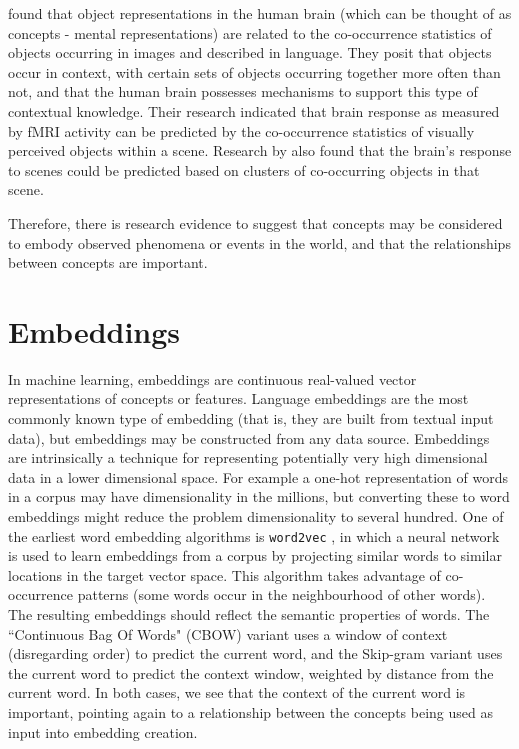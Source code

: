 \cite{CoocurrenceVisionLanguage2021} found that object representations in the human brain (which can be thought of as concepts - mental representations) are related to the co-occurrence statistics of objects occurring in images and described in language. They posit that objects occur in context, with certain sets of objects occurring together more often than not, and that the human brain possesses mechanisms to support this type of contextual knowledge. Their research indicated that brain response as measured by fMRI activity can be predicted by the co-occurrence statistics of visually perceived objects within a scene. Research by \cite{STANSBURY20131025} also found that the brain's response to scenes could be predicted based on clusters of co-occurring objects in that scene. 

Therefore, there is research evidence to suggest that concepts may be considered to embody observed phenomena or events in the world, and that the relationships between concepts are important. 


\section{Embeddings}

In machine learning, embeddings are continuous real-valued vector representations of concepts or features. Language embeddings are the most commonly known type of embedding (that is, they are built from textual input data), but embeddings may be constructed from any data source. Embeddings are intrinsically a technique for representing potentially very high dimensional data in a lower dimensional space. For example a one-hot representation of words in a corpus may have dimensionality in the millions, but converting these to word embeddings might reduce the problem dimensionality to several hundred. One of the earliest word embedding algorithms is \texttt{word2vec} \cite{word2vec}, in which a neural network is used to learn embeddings from a corpus by projecting similar words to similar locations in the target vector space. This algorithm takes advantage of co-occurrence patterns (some words occur in the neighbourhood of other words). The resulting embeddings should reflect the semantic properties of words. The ``Continuous Bag Of Words" (CBOW) variant uses a window of context (disregarding order) to predict the current word, and the Skip-gram variant uses the current word to predict the context window, weighted by distance from the current word. In both cases, we see that the context of the current word is important, pointing again to a relationship between the concepts being used as input into embedding creation. 

